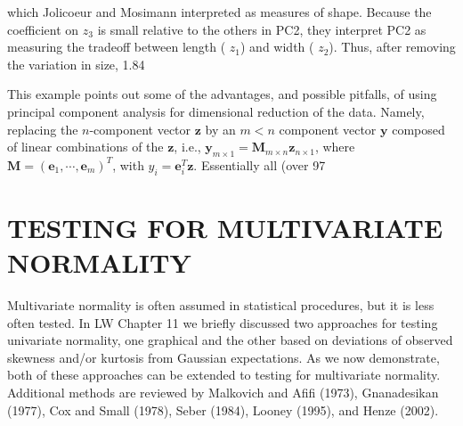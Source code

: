 \documentclass{article}
\begin{document}
which Jolicoeur and Mosimann interpreted as measures of shape. Because the coefficient on  $ z_{3} $ is small relative to the others in PC2, they interpret PC2 as measuring the tradeoff between length ( $ z_{1} $) and width ( $ z_{2} $). Thus, after removing the variation in size, 1.84%

This example points out some of the advantages, and possible pitfalls, of using principal component analysis for dimensional reduction of the data. Namely, replacing the $n$-component vector $\mathbf{z}$ by an $m < n$ component vector $\mathbf{y}$ composed of linear combinations of the $\mathbf{z}$, i.e., $\mathbf{y}_{m \times 1} = \mathbf{M}_{m \times n} \mathbf{z}_{n \times 1}$, where $\mathbf{M} = (\mathbf{e}_{1}, \cdots, \mathbf{e}_{m})^{T}$, with $y_{i} = \mathbf{e}_{i}^{T} \mathbf{z}$. Essentially all (over 97%

\section{TESTING FOR MULTIVARIATE NORMALITY}
Multivariate normality is often assumed in statistical procedures, but it is less often tested. In LW Chapter 11 we briefly discussed two approaches for testing univariate normality, one graphical and the other based on deviations of observed skewness and/or kurtosis from Gaussian expectations. As we now demonstrate, both of these approaches can be extended to testing for multivariate normality. Additional methods are reviewed by Malkovich and Afifi (1973), Gnanadesikan (1977), Cox and Small (1978), Seber (1984), Looney (1995), and Henze (2002).
\end{document}
